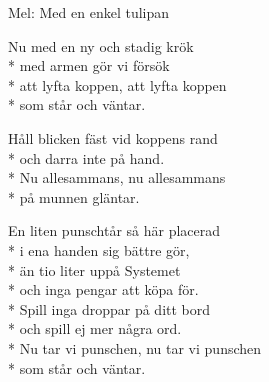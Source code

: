 \begin{SongText}[Födelsedagspunsch]
    \begin{SongInfo}
        Mel: Med en enkel tulipan
    \end{SongInfo}
    \begin{SongVerse}
        Nu med en ny och stadig krök\\*%
        med armen gör vi försök\\*%
        att lyfta koppen, att lyfta koppen\\*%
        som står och väntar.
    \end{SongVerse}
    \begin{SongVerse}
        Håll blicken fäst vid koppens rand\\*%
        och darra inte på hand.\\*%
        Nu allesammans, nu allesammans\\*%
        på munnen gläntar.
    \end{SongVerse}
    \begin{SongVerse}
        En liten punschtår så här placerad\\*%
        i ena handen sig bättre gör,\\*%
        än tio liter uppå Systemet\\*%
        och inga pengar att köpa för.\\*%
        Spill inga droppar på ditt bord\\*%
        och spill ej mer några ord.\\*%
        Nu tar vi punschen, nu tar vi punschen\\*%
        som står och väntar.
    \end{SongVerse}\end{SongText}
